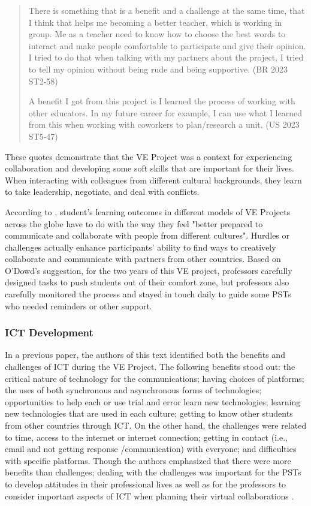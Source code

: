 \begin{quote}
There is something that is a benefit and a challenge at the same time, that I think that helps me becoming a better teacher, which is working in group. Me as a teacher need to know how to choose the best words to interact and make people comfortable to participate and give their opinion. I tried to do that when talking with my partners about the project, I tried to tell my opinion without being rude and being supportive. (BR 2023 ST2-58)
			
A benefit I got from this project is I learned the process of working with other educators. In my future career for example, I can use what I learned from this when working with coworkers to plan/research a unit. (US 2023 ST5-47)
\end{quote}

These quotes demonstrate that the VE Project was a context for
experiencing collaboration and developing some soft skills that are
important for their lives. When interacting with colleagues from
different cultural backgrounds, they learn to take leadership,
negotiate, and deal with conflicts.

According to \textcite{odowd2021virtual}, student’s
learning outcomes in different models of VE Projects across the globe
have to do with the way they feel "better prepared to communicate and
collaborate with people from different cultures". Hurdles or challenges
actually enhance participants' ability to find ways to creatively
collaborate and communicate with partners from other countries. Based on
O'Dowd's suggestion, for the two years of this VE project, professors
carefully designed tasks to push students out of their comfort zone, but
professors also carefully monitored the process and stayed in touch
daily to guide some PSTs who needed reminders or other support.
		
\subsubsection{ICT Development}\label{sub-sub-sec-ictdevelopment}

In a previous paper, the authors of this text identified both the
benefits and challenges of ICT during the VE Project. The following
benefits stood out: the critical nature of technology for the
communications; having choices of platforms; the uses of both
synchronous and asynchronous forms of technologies; opportunities to
help each or use trial and error learn new technologies; learning new
technologies that are used in each culture; getting to know other
students from other countries through ICT. On the other hand, the
challenges were related to time, access to the internet or internet
connection; getting in contact (i.e., email and not getting
response /communication) with everyone; and difficulties with specific
platforms. Though the authors emphasized that there were more benefits
than challenges; dealing with the challenges was important for the PSTs
to develop attitudes in their professional lives as well as for the
professors to consider important aspects of ICT when planning their
virtual collaborations \cite{calvo2023investigating}.

